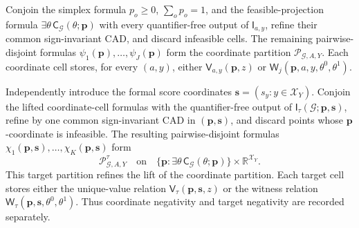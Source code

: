 Conjoin the simplex formula \(p_o\geq0\), \(\sum_op_o=1\), and the feasible-projection formula \(\exists\theta\,\mathsf C_{\mathcal G}(\theta;\mathbf p)\) with every quantifier-free output of \(\mathsf I_{a,y}\), refine their common sign-invariant CAD, and discard infeasible cells. The remaining pairwise-disjoint formulas \(\psi_1(\mathbf p),\ldots,\psi_J(\mathbf p)\) form the coordinate partition \(\mathscr P_{\mathcal G,A,Y}\). Each coordinate cell stores, for every \((a,y)\), either \(\mathsf V_{a,y}(\mathbf p,z)\) or \(\mathsf W_j(\mathbf p,a,y,\theta^0,\theta^1)\).

Independently introduce the formal score coordinates \(\mathbf s=(s_y:y\in\mathcal X_Y)\). Conjoin the lifted coordinate-cell formulas with the quantifier-free output of \(\mathsf I_{\tau}(\mathcal G;\mathbf p,\mathbf s)\), refine by one common sign-invariant CAD in \((\mathbf p,\mathbf s)\), and discard points whose \(\mathbf p\)-coordinate is infeasible. The resulting pairwise-disjoint formulas \(\chi_1(\mathbf p,\mathbf s),\ldots,\chi_K(\mathbf p,\mathbf s)\) form
\[
\mathscr P^{\tau}_{\mathcal G,A,Y}
\quad\text{on}\quad
\{\mathbf p:\exists\theta\,\mathsf C_{\mathcal G}(\theta;\mathbf p)\}
\times\mathbb R^{\mathcal X_Y}.
\]
This target partition refines the lift of the coordinate partition. Each target cell stores either the unique-value relation \(\mathsf V_{\tau}(\mathbf p,\mathbf s,z)\) or the witness relation \(\mathsf W_{\tau}(\mathbf p,\mathbf s,\theta^0,\theta^1)\). Thus coordinate negativity and target negativity are recorded separately.